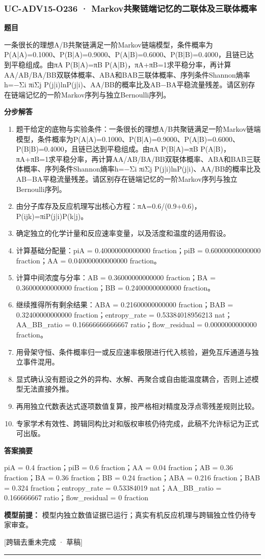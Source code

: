 \documentclass[UTF8,11pt,a4paper]{ctexart}
\begin{document}
\subsubsection*{UC-ADV15-O236 · Markov共聚链端记忆的二联体及三联体概率}
\noindent\textbf{题目}\par
一条很长的理想A/B共聚链满足一阶Markov链端模型，条件概率为P(A|A)=0.1000、P(B|A)=0.9000、P(A|B)=0.6000、P(B|B)=0.4000，且链已达到平稳组成。由πA P(B|A)=πB P(A|B)，πA+πB=1求平稳分率，再计算AA/AB/BA/BB双联体概率、ABA和BAB三联体概率、序列条件Shannon熵率h=−Σi πiΣj P(j|i)lnP(j|i)、AA/BB的概率比及AB−BA平稳流量残差。请区别存在链端记忆的一阶Markov序列与独立Bernoulli序列。\par
\medskip\noindent\textbf{分步解答}
\begin{enumerate}
\item 题干给定的底物与实验条件：一条很长的理想A/B共聚链满足一阶Markov链端模型，条件概率为P(A|A)=0.1000、P(B|A)=0.9000、P(A|B)=0.6000、P(B|B)=0.4000，且链已达到平稳组成。由πA P(B|A)=πB P(A|B)，πA+πB=1求平稳分率，再计算AA/AB/BA/BB双联体概率、ABA和BAB三联体概率、序列条件Shannon熵率h=−Σi πiΣj P(j|i)lnP(j|i)、AA/BB的概率比及AB−BA平稳流量残差。请区别存在链端记忆的一阶Markov序列与独立Bernoulli序列。
\item 由分子库存及反应机理写出核心方程：πA=0.6/(0.9+0.6)，P(ijk)=πiP(j|i)P(k|j)。
\item 确定独立的化学计量和反应速率变量，以及活度和温度的适用假设。
\item 计算基础分配量：piA = 0.40000000000000 fraction；piB = 0.60000000000000 fraction；AA = 0.040000000000000 fraction。
\item 计算中间浓度与分率：AB = 0.36000000000000 fraction；BA = 0.36000000000000 fraction；BB = 0.24000000000000 fraction。
\item 继续推得所有剩余结果：ABA = 0.21600000000000 fraction；BAB = 0.32400000000000 fraction；entropy\_rate = 0.53384018956213 nat；AA\_BB\_ratio = 0.16666666666667 ratio；flow\_residual = 0.0000000000000 fraction。
\item 用骨架守恒、条件概率归一或反应速率极限进行代入核验，避免互斥通道与独立事件混用。
\item 显式确认没有题设之外的异构、水解、再聚合或自由能温度耦合，否则上述模型无法直接外推。
\item 再用独立代数表达式逐项数值复算，按严格相对精度及浮点零残差规则比较。
\item 专家学术有效性、跨辑同构比对和版权审核仍待完成，此稿不允许标记为正式可出版。
\end{enumerate}
\noindent\textbf{答案摘要}\par
piA = 0.4 fraction；piB = 0.6 fraction；AA = 0.04 fraction；AB = 0.36 fraction；BA = 0.36 fraction；BB = 0.24 fraction；ABA = 0.216 fraction；BAB = 0.324 fraction；entropy\_rate = 0.53384019 nat；AA\_BB\_ratio = 0.166666667 ratio；flow\_residual = 0 fraction\par
\noindent\textbf{模型前提：}
模型内独立数值证据已运行；真实有机反应机理与跨辑独立性仍待专家审查。\par
\noindent\textcolor{red!65!black}{[跨辑去重未完成 · 草稿]} \par
\medskip\hrule\medskip
{}
\end{document}
